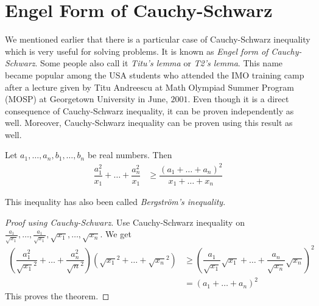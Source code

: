 \documentclass{subfile}
\begin{document}
	\chapter{Engel Form of Cauchy-Schwarz}\label{ch:engel}
	We mentioned earlier that there is a particular case of Cauchy-Schwarz inequality which is very useful for solving problems. It is known as \textit{Engel form of Cauchy-Schwarz}. Some people also call it \textit{Titu's lemma} or \textit{T2's lemma}. This name became popular among the USA students who attended the IMO training camp after a lecture given by Titu Andreescu at Math Olympiad Summer Program (MOSP) at Georgetown University in June, $2001$. Even though it is a direct consequence of Cauchy-Schwarz inequality, it can be proven independently as well. Moreover, Cauchy-Schwarz inequality can be proven using this result as well.
		\begin{theorem}\label{thm:engel}
			Let $a_1,\ldots,a_n,b_1,\ldots,b_n$ be real numbers. Then
				\begin{align}
					\dfrac{a_1^2}{x_1}+\ldots+\dfrac{a_n^2}{x_1}
						& \geq\dfrac{(a_1+\ldots+a_n)^2}{x_1+\ldots+x_n}\label{ineq:engel}
				\end{align}
		\end{theorem}
	This inequality has also been called \textit{Bergstr\"{o}m's inequality}. 
		\begin{proof}[Proof using Cauchy-Schwarz]
			Use Cauchy-Schwarz inequality on $\frac{a_1}{\sqrt{x_1}},\ldots,\frac{a_1}{\sqrt{x_1}},\sqrt{x_1},\ldots,\sqrt{x_n}$. We get
				\begin{align*}
					\left(\dfrac{a_1^2}{\sqrt{x_1}^2}+\ldots+\dfrac{a_n^2}{\sqrt{n}^2}\right)\left(\sqrt{x_1}^2+\ldots+\sqrt{x_n}^2\right)
						& \geq\left(\dfrac{a_1}{\sqrt{x_1}}\sqrt{x_1}+\ldots+\dfrac{a_n}{\sqrt{x_n}}\sqrt{x_n}\right)^2\\
						& = (a_1+\ldots+a_n)^2
				\end{align*}
			This proves the theorem.
		\end{proof}
	
\end{document}
